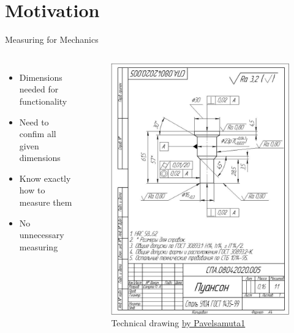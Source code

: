 \documentclass{beamer}
\title{Hands on Systematic Innovation\\
	Problem Solving Tools - Measurement Problems
	\vskip1em}
\subtitle{Presentation in the Module 10-202-2312}
\author{Victor Jüttner}
\date{24. May 2022}
\begin{document}
	\begin{frame}[plain]
		\maketitle
	\end{frame}

	\section{Motivation}
	
	\begin{frame}{Measuring for Mechanics}
		\begin{columns}
			\begin{itemize}
				\item Dimensions needed for functionality
				\item Need to confim all given dimensions
				\item Know exactly how to measure them
				\item No unnecessary measuring
			\end{itemize}
			\begin{figure}
				\centering
				\includegraphics[width=.7\textwidth]{img/Technical_drawing_CAD.jpg}
				\caption{Technical drawing \href{https://commons.wikimedia.org/w/index.php?curid=113182825}{by Pavelsamuta1}}
			\end{figure}	
		\end{columns}
	\end{frame}
\end{document}
